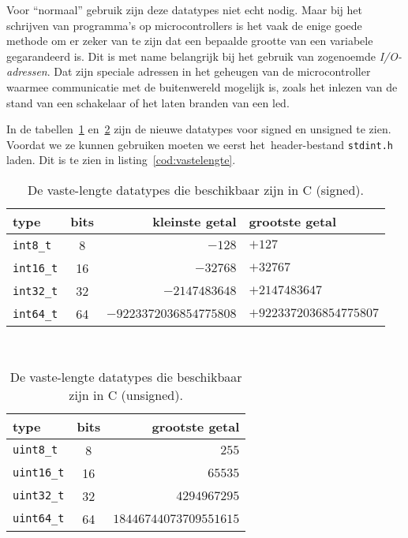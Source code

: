 Voor ``normaal'' gebruik zijn deze datatypes niet echt nodig. Maar bij het schrijven van programma's op microcontrollers is het vaak de enige goede methode om er zeker van te zijn dat een bepaalde grootte van een variabele gegarandeerd is. Dit is met name belangrijk bij het gebruik van zogenoemde \textsl{I/O-adressen}. Dat zijn speciale adressen in het geheugen van de microcontroller waarmee communicatie met de buitenwereld mogelijk is, zoals het inlezen van de stand van een schakelaar of het laten branden van een led.

In de tabellen~\ref{tab:varinttdatatypes} en~\ref{tab:varuinttdatatypes} zijn de nieuwe datatypes voor signed en unsigned te zien. Voordat we ze kunnen gebruiken moeten we eerst het\ header-bestand \texttt{stdint.h} laden. Dit is te zien in listing~\ref{cod:vastelengte}.

\begin{table}[!ht]
\centering
\caption{De vaste-lengte datatypes die beschikbaar zijn in C (signed).}
\label{tab:varinttdatatypes}
\begin{tabular}{@{}lcrl@{}}
\toprule
\textbf{type}          & \textbf{bits} & \textbf{kleinste getal} &  \textbf{grootste getal} \\ \midrule
\texttt{int8\_t}       & 8             & $-128$                  & $+127$  \\
\texttt{int16\_t}      & 16            & $-32768$                & $+32767$  \\
\texttt{int32\_t}      & 32            & $-2147483648$           & $+2147483647$  \\
\texttt{int64\_t}      & 64            & $-9223372036854775808$  & $+9223372036854775807$  \\
\bottomrule
\end{tabular}\\
\end{table}

\begin{table}[!ht]
\centering
\caption{De vaste-lengte datatypes die beschikbaar zijn in C (unsigned).}
\label{tab:varuinttdatatypes}
\begin{tabular}{@{}lcr@{}}
\toprule
\textbf{type}          & \textbf{bits} & \textbf{grootste getal} \\ \midrule
\texttt{uint8\_t}       & 8             & $255$                   \\
\texttt{uint16\_t}      & 16            & $65535$                 \\
\texttt{uint32\_t}      & 32            & $4294967295$            \\
\texttt{uint64\_t}      & 64            & $18446744073709551615$   \\
\bottomrule
\end{tabular}\\
\end{table}

